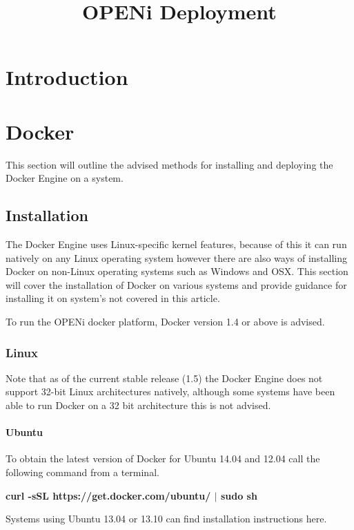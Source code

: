 \documentclass[10pt,a4paper]{article}
\title{OPENi Deployment}
\begin{document}
\maketitle

\section{Introduction}
 


\section{Docker}
This section will outline the advised methods for installing and deploying the Docker Engine on a system.

\subsection{Installation}
The Docker Engine uses Linux-specific kernel features, because of this it can run natively on any Linux operating system however there are also ways of installing Docker on non-Linux operating systems such as Windows and OSX. This section will cover the installation of Docker on various systems and provide guidance for installing it on system's not covered in this article.

To run the OPENi docker platform, Docker version 1.4 or above is advised. 

\subsubsection{Linux}
Note that as of the current stable release (1.5) the Docker Engine does not support 32-bit Linux architectures natively, although some systems have been able to run Docker on a 32 bit architecture this is not advised.

\newpage

\paragraph{Ubuntu}
To obtain the latest version of Docker for Ubuntu 14.04 and 12.04 call the following command from a terminal.

\centerline{\textbf{curl -sSL https://get.docker.com/ubuntu/ $\vert$ sudo sh}}

Systems using Ubuntu 13.04 or 13.10 can find installation instructions here.
 
\end{document}
